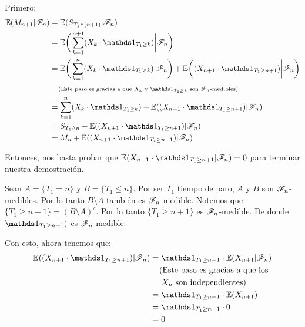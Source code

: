 \begin{itemize}
			Primero:
			\begin{align}
				\E(M_{n+1} | \F_{n})    &=  \E( S_{T_1 \wedge (n+1)} | \F_{n})                                                          \\
                                        &=  \E\bigg( \sum_{k=1}^{n+1} (X_k \cdot \indic_{T_1 \geq k})\bigg| \F_{n}\bigg)                \\	 			
                                        &=  \E\bigg( \sum_{k=1}^{n} (X_k \cdot \indic_{T_1 \geq k}) \bigg| \F_{n}\bigg) +
                                            \E\bigg((X_{n+1} \cdot \indic_{T_1 \geq n+1}) \bigg| \F_{n}\bigg)                           \\
                                        &\comment{Este paso es gracias a que $X_k$ y $\indic_{T_1 \geq k}$ son $\F_n$-medibles}  		\\
                                        &=  \sum_{k=1}^{n} (X_k \cdot \indic_{T_1 \geq k}) + 
                                            \E((X_{n+1} \cdot \indic_{T_1 \geq n+1}) | \F_{n})                                          \\
                                        &=  S_{T_1 \wedge n} + \E((X_{n+1} \cdot \indic_{T_1 \geq n+1}) | \F_{n})                       \\
                                        &=  M_n + \E((X_{n+1} \cdot \indic_{T_1 \geq n+1}) | \F_{n})
			\end{align}
			
			Entonces, nos basta probar que $\E(X_{n+1} \cdot \indic_{T_1 \geq n+1} |
			 \F_{n}) = 0$ para terminar nuestra demostración.\pn
			 
			Sean $A = \{T_1 = n\}$ y $B = \{ T_1 \leq n\}$. Por ser $T_1$ tiempo de paro,
			$A$ y $B$ son $\mathscr{F}_n$-medibles. Por lo tanto $B \setminus A$ también es $\mathscr{F}_n$-medible. 
			Notemos que $\{T_1 \geq n+1\} = (B \setminus A)^c$. Por lo tanto $\{T_1 \geq n+1\}$ es
			$\mathscr{F}_n$-medible. De donde  $\indic_{T_1 \geq n+1})$ es $\mathscr{F}_n$-medible.\pn
			
			Con esto, ahora tenemos que:
			\begin{align}
				\E((X_{n+1} \cdot \indic_{T_1 \geq n+1}) | \F_{n})  &=  \indic_{T_1 \geq n+1} \cdot \E(X_{n+1} | \F_{n})                        \\
                                                                    &\;\;\;\;\mbox{(Este paso es gracias a que los }                            \\
                                                                    &\;\;\;\;\;\mbox{$X_n$ son independientes)}                                 \\
                                                                    &=  \indic_{T_1 \geq n+1} \cdot \E(X_{n+1} )                                \\
                                                                    &=  \indic_{T_1 \geq n+1} \cdot 0                                           \\
                                                                    &=  0
			\end{align}\pn
			

\end{itemize}
